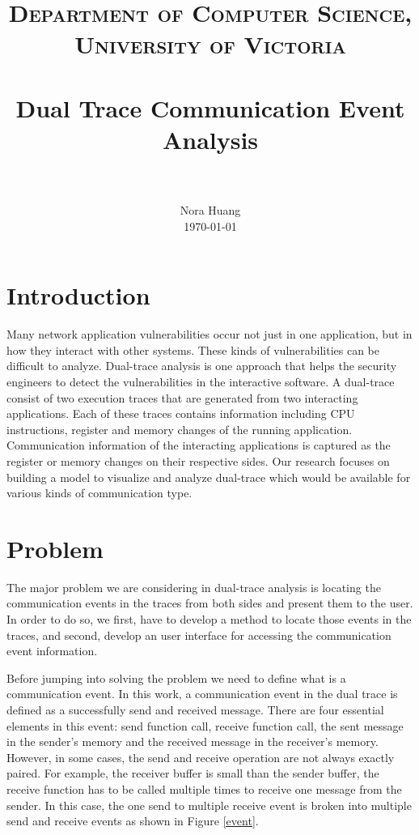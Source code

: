 \documentclass[paper=a4, fontsize=11pt]{scrartcl}
\title{
		\usefont{OT1}{bch}{b}{n}
		\normalfont \normalsize \textsc{Department of Computer Science,  University of Victoria} \\ [25pt]
		\horrule{0.5pt} \\[0.4cm]
		\huge Dual Trace Communication Event Analysis  \\
		\horrule{2pt} \\[0.5cm]
}
\author{
		\normalfont 								\normalsize
        Nora Huang\\[-3pt]		\normalsize
        \today
}
\date{}
\numberwithin{equation}{section}		%
\numberwithin{figure}{section}			%
\numberwithin{table}{section}				%
\begin{document}
\maketitle

\section{Introduction}
Many network application vulnerabilities occur not just in one application, but in how they interact with other systems. These kinds of vulnerabilities can be difficult to analyze. Dual-trace analysis is one approach that helps the security engineers to detect the vulnerabilities in the interactive software. A dual-trace consist of two execution traces that are generated from two interacting applications. Each of these traces contains information including CPU instructions, register and memory changes of the running application. Communication information of the interacting applications is captured as the register or memory changes on their respective sides. Our research focuses on building a model to visualize and analyze dual-trace which would be available for various kinds of communication type.

\section{Problem}
The major problem we are considering in dual-trace analysis is locating the communication events in the traces from both sides and present them to the user. In order to do so,  we first, have to develop a method to locate those events in the traces, and second, develop an user interface for accessing the communication event information.\par

Before jumping into solving the problem we need to define what is a communication event. In this work, a communication event in the dual trace is defined as a successfully send and received message. There are four essential elements in this event: send function call, receive function call, the sent message in the sender's memory and the received message in the receiver's memory. However, in some cases, the send and receive operation are not always exactly paired. For example, the receiver buffer is small than the sender buffer, the receive function has to be called multiple times to receive one message from the sender. In this case, the one send to multiple receive event is broken into multiple send and receive events as shown in Figure \ref{event}. 
\end{document}
